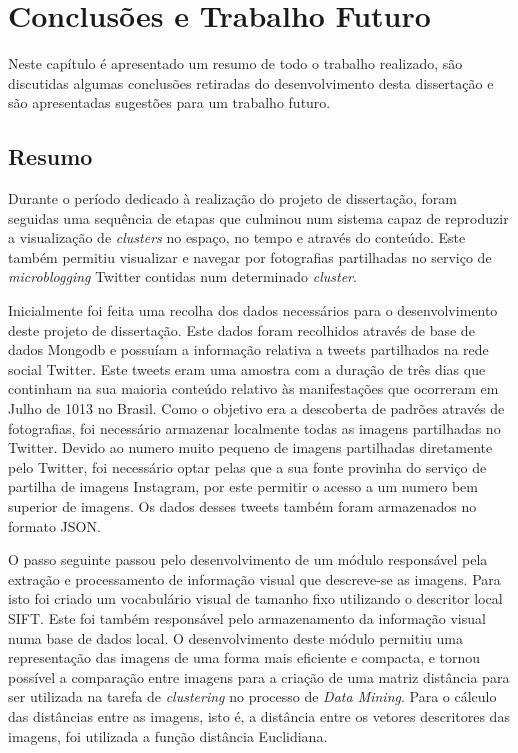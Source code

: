 \chapter{Conclusões e Trabalho Futuro} \label{chap:concl}

Neste capítulo é apresentado um resumo de todo o trabalho realizado, são discutidas algumas conclusões retiradas do desenvolvimento desta dissertação e são apresentadas sugestões para um trabalho futuro.

\section{Resumo}

Durante o período dedicado à realização do projeto de dissertação, foram seguidas uma sequência de etapas que culminou num sistema capaz de reproduzir a visualização de \textit{clusters} no espaço, no tempo e através do conteúdo. Este também permitiu visualizar e navegar por fotografias partilhadas no serviço de \textit{microblogging} Twitter contidas num determinado \textit{cluster}.

Inicialmente foi feita uma recolha dos dados necessários para o desenvolvimento deste projeto de dissertação. Este dados foram recolhidos através de base de dados Mongodb e possuíam a informação relativa a tweets partilhados na rede social Twitter. Este tweets eram uma amostra com a duração de três dias que continham na sua maioria conteúdo relativo às manifestações que ocorreram em Julho de 1013 no Brasil. Como o objetivo era a descoberta de padrões através de fotografias, foi necessário armazenar localmente todas as imagens partilhadas no Twitter. Devido ao numero muito pequeno de imagens partilhadas diretamente pelo Twitter, foi necessário optar pelas que a sua fonte provinha do serviço de partilha de imagens Instagram, por este permitir o acesso a um numero bem superior de imagens. Os dados desses tweets também foram armazenados no formato JSON.

O passo seguinte passou pelo desenvolvimento de um módulo responsável pela extração e processamento de informação visual que descreve-se as imagens. Para isto foi criado um vocabulário visual de tamanho fixo utilizando o descritor local SIFT. Este foi também responsável pelo armazenamento da informação visual numa base de dados local. O desenvolvimento deste módulo permitiu uma representação das imagens de uma forma mais eficiente e compacta, e tornou possível a comparação entre imagens para a criação de uma matriz distância para ser utilizada na tarefa de \textit{clustering} no processo de \textit{Data Mining}. Para o cálculo das distâncias entre as imagens, isto é, a distância entre os vetores descritores das imagens, foi utilizada a função distância Euclidiana.

